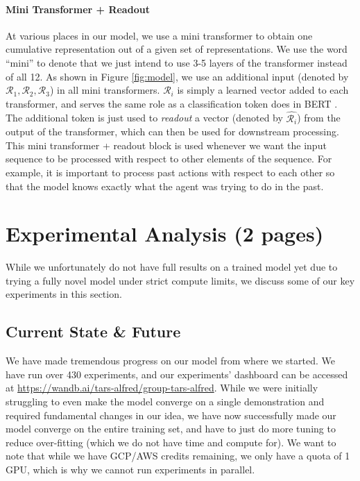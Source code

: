 \documentclass[11pt,a4paper]{article}
\begin{document}
\paragraph{Mini Transformer + Readout}
At various places in our model, we use a mini transformer to obtain one cumulative representation out of a given set of representations. We use the word ``mini'' to denote that we just intend to use 3-5 layers of the transformer instead of all 12.  As shown in Figure \ref{fig:model}, we use an additional input (denoted by $\mathcal{R}_1, \mathcal{R}_2, \mathcal{R}_3$) in all mini transformers. $\mathcal{R}_i$ is simply a learned vector added to each transformer, and serves the same role as a classification token does in BERT \cite{devlin2018bert}. The additional token is just used to \emph{readout} a vector (denoted by $\hat{\mathcal{R}_i}$) from the output of the transformer, which can then be used for downstream processing. This mini transformer + readout block is used whenever we want the input sequence to be processed with respect to other elements of the sequence. For example, it is important to process past actions with respect to each other so that the model knows exactly what the agent was trying to do in the past.

\section{Experimental Analysis (2 pages)}
While we unfortunately do not have full results on a trained model yet due to trying a fully novel model under strict compute limits, we discuss some of our key experiments in this section.

\subsection{Current State \& Future}
We have made tremendous progress on our model from where we started. We have run over 430 experiments, and our experiments' dashboard can be accessed at \url{https://wandb.ai/tars-alfred/group-tars-alfred}. While we were initially struggling to even make the model converge on a single demonstration and required fundamental changes in our idea, we have now successfully made our model converge on the entire training set, and have to just do more tuning to reduce over-fitting (which we do not have time and compute for). We want to note that while we have GCP/AWS credits remaining, we only have a quota of 1 GPU, which is why we cannot run experiments in parallel.
\end{document}
